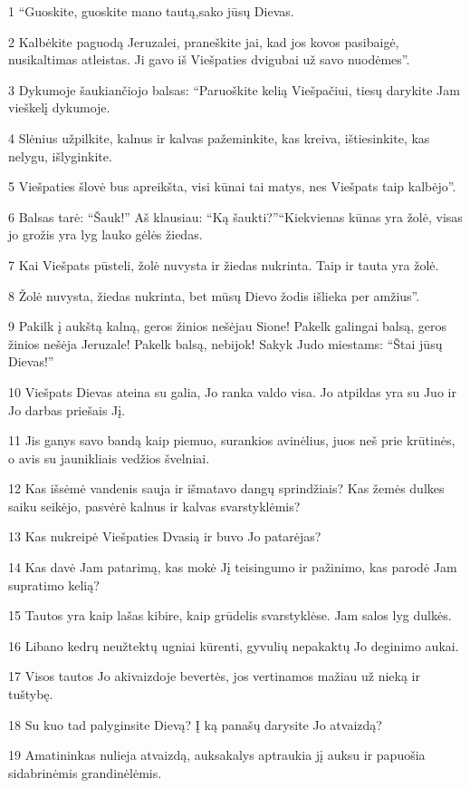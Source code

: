 \par 1 “Guoskite, guoskite mano tautą,­sako jūsų Dievas.­ 
\par 2 Kalbėkite paguodą Jeruzalei, praneškite jai, kad jos kovos pasibaigė, nusikaltimas atleistas. Ji gavo iš Viešpaties dvigubai už savo nuodėmes”. 
\par 3 Dykumoje šaukiančiojo balsas: “Paruoškite kelią Viešpačiui, tiesų darykite Jam vieškelį dykumoje. 
\par 4 Slėnius užpilkite, kalnus ir kalvas pažeminkite, kas kreiva, ištiesinkite, kas nelygu, išlyginkite. 
\par 5 Viešpaties šlovė bus apreikšta, visi kūnai tai matys, nes Viešpats taip kalbėjo”. 
\par 6 Balsas tarė: “Šauk!” Aš klausiau: “Ką šaukti?”­“Kiekvienas kūnas yra žolė, visas jo grožis yra lyg lauko gėlės žiedas. 
\par 7 Kai Viešpats pūsteli, žolė nuvysta ir žiedas nukrinta. Taip ir tauta yra žolė. 
\par 8 Žolė nuvysta, žiedas nukrinta, bet mūsų Dievo žodis išlieka per amžius”. 
\par 9 Pakilk į aukštą kalną, geros žinios nešėjau Sione! Pakelk galingai balsą, geros žinios nešėja Jeruzale! Pakelk balsą, nebijok! Sakyk Judo miestams: “Štai jūsų Dievas!” 
\par 10 Viešpats Dievas ateina su galia, Jo ranka valdo visa. Jo atpildas yra su Juo ir Jo darbas priešais Jį. 
\par 11 Jis ganys savo bandą kaip piemuo, surankios avinėlius, juos neš prie krūtinės, o avis su jaunikliais vedžios švelniai. 
\par 12 Kas išsėmė vandenis sauja ir išmatavo dangų sprindžiais? Kas žemės dulkes saiku seikėjo, pasvėrė kalnus ir kalvas svarstyklėmis? 
\par 13 Kas nukreipė Viešpaties Dvasią ir buvo Jo patarėjas? 
\par 14 Kas davė Jam patarimą, kas mokė Jį teisingumo ir pažinimo, kas parodė Jam supratimo kelią? 
\par 15 Tautos yra kaip lašas kibire, kaip grūdelis svarstyklėse. Jam salos lyg dulkės. 
\par 16 Libano kedrų neužtektų ugniai kūrenti, gyvulių nepakaktų Jo deginimo aukai. 
\par 17 Visos tautos Jo akivaizdoje bevertės, jos vertinamos mažiau už nieką ir tuštybę. 
\par 18 Su kuo tad palyginsite Dievą? Į ką panašų darysite Jo atvaizdą? 
\par 19 Amatininkas nulieja atvaizdą, auksakalys aptraukia jį auksu ir papuošia sidabrinėmis grandinėlėmis. 
